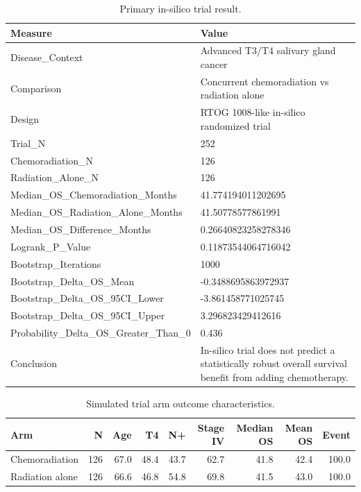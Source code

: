 \documentclass[10pt,twocolumn]{article}
\begin{document}
\begin{table}[t]
\centering
\caption{Primary in-silico trial result.}
\label{tab:2}
\scriptsize
\setlength{\tabcolsep}{3pt}
\begin{tabular}{p{}p{}}
\toprule
Measure & Value \\
\midrule
Disease\_Context & Advanced T3/T4 salivary gland cancer \\
Comparison & Concurrent chemoradiation vs radiation alone \\
Design & RTOG 1008-like in-silico randomized trial \\
Trial\_N & 252 \\
Chemoradiation\_N & 126 \\
Radiation\_Alone\_N & 126 \\
Median\_OS\_Chemoradiation\_Months & 41.774194011202695 \\
Median\_OS\_Radiation\_Alone\_Months & 41.50778577861991 \\
Median\_OS\_Difference\_Months & 0.26640823258278346 \\
Logrank\_P\_Value & 0.11873544064716042 \\
Bootstrap\_Iterations & 1000 \\
Bootstrap\_Delta\_OS\_Mean & -0.3488695863972937 \\
Bootstrap\_Delta\_OS\_95CI\_Lower & -3.861458771025745 \\
Bootstrap\_Delta\_OS\_95CI\_Upper & 3.296823429412616 \\
Probability\_Delta\_OS\_Greater\_Than\_0 & 0.436 \\
Conclusion & In-silico trial does not predict a statistically robust overall survival benefit from adding chemotherapy. \\
\bottomrule
\end{tabular}
\end{table}




\begin{table}[t]
\centering
\caption{Simulated trial arm outcome characteristics.}
\label{tab:3}
\scriptsize
\setlength{\tabcolsep}{4pt}
\begin{tabular}{lrrrrrrrr}
\toprule
Arm & N & Age & T4 & N+ & Stage IV & Median OS & Mean OS & Event \\
\midrule
Chemoradiation & 126 & 67.0 & 48.4 & 43.7 & 62.7 & 41.8 & 42.4 & 100.0 \\
Radiation alone & 126 & 66.6 & 46.8 & 54.8 & 69.8 & 41.5 & 43.0 & 100.0 \\
\bottomrule
\end{tabular}
\end{table}
\end{document}
